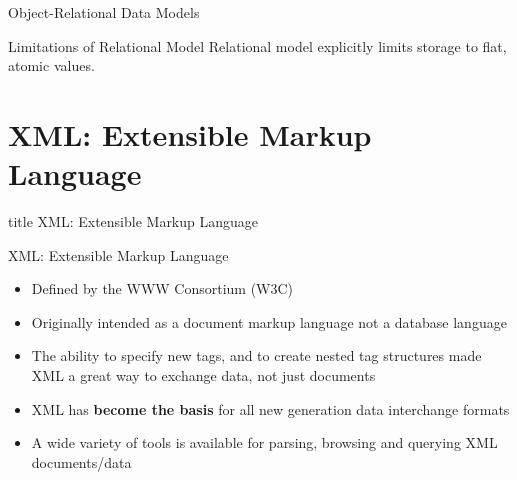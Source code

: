 \documentclass[aspectratio=169, xcolor=dvipsnames]{beamer}
\begin{document}
\begin{frame}{Object-Relational Data Models}
    \begin{alertblock}{Limitations of Relational Model}
        Relational model explicitly limits storage to flat, atomic values.
    \end{alertblock}
    
\end{frame}

\section{XML: Extensible Markup Language}

\begin{frame}
  \vfill
  \centering
  \begin{beamercolorbox}[sep=8pt,center,shadow=true,rounded=true]{title}
    XML: Extensible Markup Language\par%
  \end{beamercolorbox}
  \vfill
\end{frame}

\begin{frame}{XML: Extensible Markup Language}
    \begin{itemize}[<+->]
        \item Defined by the WWW Consortium (W3C)
        \item Originally intended as a document markup language not a database language
        \item The ability to specify new tags, and to create nested tag structures made XML a great way to exchange data, not just documents
        \item XML has \textbf{become the basis} for all new generation data interchange formats
        \item A wide variety of tools is available for parsing, browsing and querying XML documents/data
    \end{itemize}
\end{frame}
\end{document}
